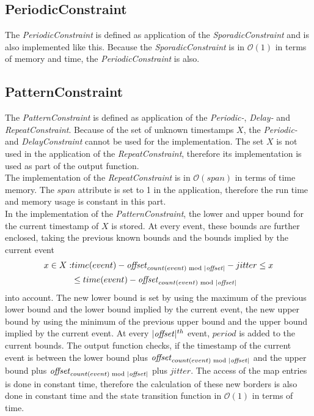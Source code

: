 \subsection{PeriodicConstraint}
	The \emph{PeriodicConstraint} is defined as application of the \emph{SporadicConstraint} and is also implemented like this. Because the \emph{SporadicConstraint} is in $\mathcal{O}(1)$ in terms of memory and time, the \emph{PeriodicConstraint} is also.
	
\subsection{PatternConstraint}
	The \emph{PatternConstraint} is defined as application of the \emph{Periodic-}, \emph{Delay-} and \emph{RepeatConstraint}. Because of the set of unknown timestamps $X$, the \emph{Periodic-} and \emph{DelayConstraint} cannot be used for the implementation. The set $X$ is not used in the application of the \emph{RepeatConstraint}, therefore its implementation is used as part of the output function.\\
	The implementation of the \emph{RepeatConstraint} is in $\mathcal{O}(span)$ in terms of time memory. The $span$ attribute is set to 1 in the application, therefore the run time and memory usage is constant in this part.\\
	In the implementation of the \emph{PatternConstraint}, the lower and upper bound for the current timestamp of $X$ is stored. At every event, these bounds are further enclosed, taking the previous known bounds and the bounds implied by the current event
	\begin{align}
		x\in X: &time(event)-\text{\emph{offset}}_{count(event)\text{ mod }|\text{\emph{offset}}|}-jitter \leq x\\
			     &\leq  time(event)-\text{\emph{offset}}_{count(event)\text{ mod }|\text{\emph{offset}}|}
	\end{align}
	into account. The new lower bound is set by using the maximum of the previous lower bound and the lower bound implied by the current event, the new upper bound by using the minimum of the previous upper bound and the upper bound implied by the current event. At every $|\text{\emph{offset}}|^{th}$ event, $period$ is added to the current bounds. The output function checks, if the timestamp of the current event is between the lower bound plus $\text{\emph{offset}}_{count(event)\text{ mod }|\text{\emph{offset}}|}$ and the upper bound plus $\text{\emph{offset}}_{count(event)\text{ mod }|\text{\emph{offset}}|}$ plus $jitter$. The access of the map entries is done in constant time, therefore the calculation of these new borders is also done in constant time and the state transition function in $\mathcal{O}(1)$ in terms of time.\\
